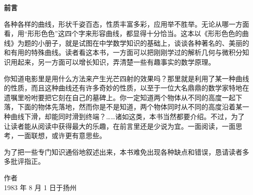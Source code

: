 \clearpage
{}
\thispagestyle{plain}

\begin{center}
  {\Large\sffamily\bfseries\color{accentblue} 前\qquad 言}
\end{center}
\vspace{4mm}

各种各样的曲线，形状千姿百态，性质丰富多彩，应用举不胜举。无论从哪一方面看，用“形形色色”这四个字来形容曲线，都显得十分恰当。这本以《形形色色的曲线》为题的小册子，就是试图在中学数学知识的基础上，谈谈各种著名的、美丽的和有用的特殊曲线。读者看这本书，一方面可以把刚刚学过的解析几何与微积分知识用起来，另一方面可以增长知识，弄清楚一些有趣事实的数学原理。

你知道电影里是用什么方法来产生光芒四射的效果吗？那里就是利用了某一种曲线的性质，而且这种曲线还有许多奇妙的性质，以至于一位大名鼎鼎的数学家特地在遗嘱里吩咐要把它刻在自己的墓碑上。你一定知道两个物体从不同的高度一起下落，下面的物体先落地，然而你是不是知道，两个物体同时从不同的高度沿着某一种曲线下滑，却能同时滑到终端？……诸如这类，本书当然都要介绍。不过，为了让读者能从阅读中获得最大的乐趣，在前言里还是少说为宜。一面阅读，一面思考，一面联想，或许更有意思些。

为了把一些专门知识通俗地叙述出来，本书难免出现各种缺点和错误，恳请读者多多批评指正。

\vspace{6mm}
\begin{flushright}
作\quad 者\hspace*{18mm}\\[2mm]
1983 年 8 月 1 日于扬州\hspace*{4mm}
\end{flushright}
\clearpage
